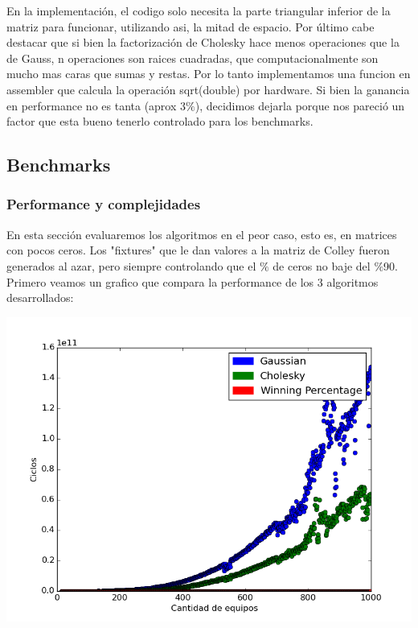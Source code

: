 En la implementación, el codigo solo necesita la parte triangular inferior de la matriz para funcionar, utilizando asi, la mitad de espacio. Por último cabe destacar que si bien la factorización de Cholesky hace menos operaciones que la de Gauss, n operaciones son raices cuadradas, que computacionalmente son mucho mas caras que sumas y restas. Por lo tanto implementamos una funcion en assembler que calcula la operación sqrt(double) por hardware. Si bien la ganancia en performance no es tanta (aprox 3$\%$), decidimos dejarla porque nos pareció un factor que esta bueno tenerlo controlado para los benchmarks.

\begin{codesnippet}
\end{codesnippet}

\subsection{Benchmarks}

\subsubsection{Performance y complejidades}

 En esta sección evaluaremos los algoritmos en el peor caso, esto es, en matrices con pocos ceros. Los "fixtures" que le dan valores a la matriz de Colley fueron generados al azar, pero siempre controlando que el $\%$ de ceros no baje del $\%$90.
 Primero veamos un grafico que compara la performance de los 3 algoritmos desarrollados:
 
 \includegraphics[scale=0.8]{img/testciclos.png}
 
